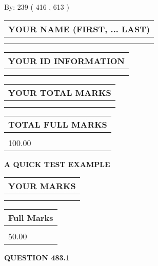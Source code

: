 \documentclass[12pt]{article}
\begin{document}
   
\hspace{1.0in} By: 
 239 ( 416 ,  613 )
   
   
   
   
\newpage 
\setcounter{page}{ 
   483001 } 
   
   
   
   
\noindent\begin{tabular}{|l|}
\hline
YOUR NAME (FIRST, ... LAST)  \\
\hline
 \\ 
 \\ 
\hline
\end{tabular}
\hspace{0.05in} \begin{tabular}{|l|}
\hline
 YOUR   ID   INFORMATION  \\
\hline
 \\ 
 \\ 
\hline
\end{tabular}
   
   
\vspace{0.2in}\noindent\begin{tabular}{|l|}
\hline
YOUR TOTAL MARKS  \\
\hline
 \\ 
 \\ 
\hline
\end{tabular}
\hspace{0.05in} \begin{tabular}{|l|}
\hline
TOTAL FULL MARKS  \\
\hline
 \\ 
100.00 \\
\hline
\end{tabular}
   
   
 \vspace{0.2in}
{\LARGE {\textbf{ A QUICK TEST EXAMPLE}}}
   
   
  
\vspace{0.2in}
  
\noindent\begin{tabular}{|l|}
\hline
 YOUR MARKS  \\
\hline
 \\ 
 \\ 
\hline
\end{tabular}
\hspace{0.05in} \begin{tabular}{|l|}
\hline
 Full Marks  \\
\hline
 \\ 
50.00 \\
\hline
\end{tabular}
{\textbf{\Large{QUESTION
483.1 
}}}
  
\end{document}
